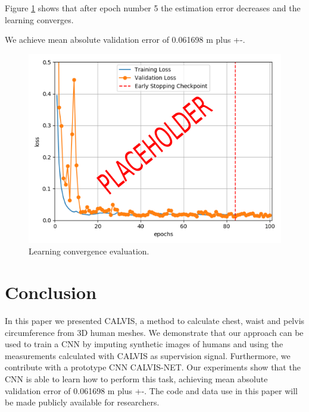 \documentclass[runningheads, orivec]{llncs}
\begin{document}
Figure \ref{fig:learning_curve} shows that after epoch number 5 the estimation 
error decreases and the learning converges.

We achieve mean absolute validation error of 0.061698 m plus +-.

\begin{figure}[H]
	\begin{center}
		\includegraphics[width=\linewidth]{Training_val_loss.png}
	\end{center}
	\caption{Learning convergence evaluation.}
	\label{fig:learning_curve}
\end{figure}


\section{Conclusion}
In this paper we presented CALVIS, a method to calculate chest, waist and pelvis circumference from 3D human meshes. 
We demonstrate that our approach can be used to train a CNN by imputing synthetic images of humans and using the measurements calculated with CALVIS as supervision signal.
Furthermore, we contribute with a prototype CNN CALVIS-NET. Our experiments show that the CNN is able to learn how to perform this task, achieving mean absolute validation error of 0.061698 m plus +-.
The code 
and data use 
in this paper will be made publicly available for researchers.
%
%
%


%
\end{document}
